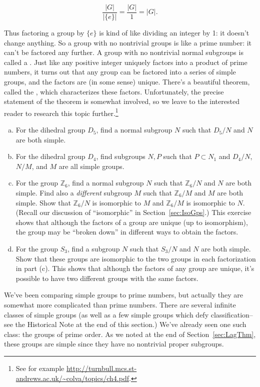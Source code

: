 {\[ \frac{|G|}{|\{e\}|} = \frac{|G|}{1} = |G|. \]

\noindent
Thus factoring a group by $\{e\}$ is kind of like dividing an integer by 1: it doesn't change anything. So a group with no nontrivial groups is like a prime number: it can't be factored any further. A group with no nontrivial normal subgroups is called a .  Just like any positive integer uniquely factors into a product of prime numbers,  it turns out that any group can be factored into a series of simple groups, and the factors are (in some sense) unique.  There's a beautiful theorem, called the , which characterizes these factors. Unfortunately, the precise statement of the theorem is somewhat involved, so we leave to the interested reader to research this topic further.\footnote{See for example \url{http://turnbull.mcs.st-andrews.ac.uk/~colva/topics/ch4.pdf}.} 

\begin{exercise}{}
\begin{enumerate}[(a)]
\item
For the dihedral group $D_5$, find a normal subgroup $N$ such that $D_5 / N$ and $N$ are both simple.
\item
For the dihedral group $D_4$, find subgroups $N, P$ such that $P \subset N_1$ and  $D_4/N$, $N/M$, and $M$ are all  simple groups.
\item
For the  group $\mathbb{Z}_6$, find a normal subgroup $N$  such that $\mathbb{Z}_6 / N$ and $N$ are both simple. Find also a \emph{different} subgroup $M$  such that $\mathbb{Z}_6 / M$ and $M$ are both simple. Show that $\mathbb{Z}_6 / N$ is isomorphic to $M$ and $\mathbb{Z}_6 / M$ is isomorphic to $N$.  (Recall our discussion of ``isomorphic'' in Section~\ref{sec:IsoGps}.) This exercise shows that although the factors of a group are unique (up to isomorphism), the group may be ``broken down'' in different ways to obtain the factors.
\item
For the  group $S_3$, find a subgroup $N$  such that $S_3 / N$ and $N$ are both simple. Show that these groups are isomorphic to the two groups in each factorization in part (c).  This shows that although the factors of any group are unique, it's possible to have two different groups with the same factors.
\end{enumerate}
\end{exercise}

We've been comparing simple groups to prime numbers, but actually they are somewhat more complicated than prime numbers. There are several infinite classes of simple groups (as well as a few simple groups which defy classification--see the Historical Note at the end of this section.) We've already seen one such  class: the groups of prime order. As we noted at the end of Section~\ref{sec:LagThm}, these groups are simple since they have
no nontrivial proper subgroups. 


}
